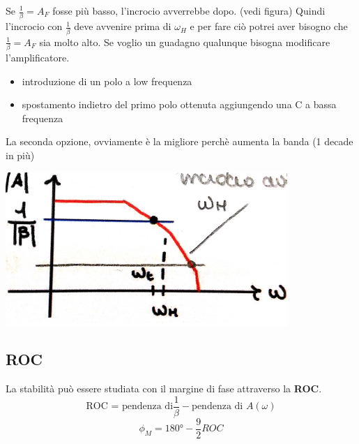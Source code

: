 \documentclass{article}
\begin{document}
\newpage
\noindent
Se $\frac{1}{\beta}=A_{F}$ fosse più basso, l'incrocio avverrebbe dopo. (vedi figura)
Quindi l'incrocio con $\frac{1}{\beta}$ deve avvenire prima di $\omega_{H}$ e per fare ciò potrei aver bisogno che $\frac{1}{\beta}=A_{F}$ sia molto alto. Se voglio un guadagno qualunque bisogna modificare l'amplificatore.
\begin{itemize}
    \item introduzione di un polo a low frequenza
    \item spostamento indietro del primo polo ottenuta aggiungendo una C a bassa frequenza
\end{itemize}
La seconda opzione, ovviamente è la migliore perchè aumenta la banda (1 decade in più) \\
\vspace{4mm}
\begin{center}
    \includegraphics[scale=1]{Bode.png}
\end{center}
\vspace{4mm}
\subsection{ROC}
La stabilità può essere studiata con il margine di fase attraverso la \textbf{ROC}.
\begin{equation}
    \mbox {ROC = pendenza di} \frac{1}{\beta} - \mbox{pendenza di }A(\omega) 
\end{equation}
\begin{equation}
    \phi_{M}=180°-\frac{9}{2}ROC
\end{equation}

\newpage
\end{document}
